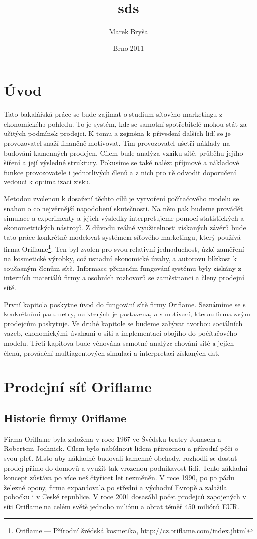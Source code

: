 \documentclass[a4wide,12pt]{report}
\title{sds}
\author{Marek Bryša}
\date{Brno 2011}
\begin{document}
\tableofcontents

\chapter*{Úvod}
Tato bakalářská práce se bude zajímat o studium síťového marketingu z ekonomického pohledu. To je systém, kde se samotní spotřebitelé mohou stát za učitých podmínek prodejci. K tomu a zejména k přivedení dalších lidí se je provozovatel snaží finančně motivovat. Tím provozovatel ušetří náklady na budování kamenných prodejen. Cílem bude analýza vzniku sítě, průběhu jejího šíření a její výsledné struktury. Pokusíme se také nalézt příjmové a nákladové funkce provozovatele i jednotlivých členů a z nich pro ně odvodit doporučení vedoucí k optimalizaci zisku.

Metodou zvolenou k dosažení těchto cílů je vytvoření počítačového modelu se snahou o co nejvěrnější napodobení skutečnosti. Na něm pak budeme provádět simulace a experimenty a jejich výsledky interpretujeme pomocí statistických a ekonometrických nástrojů. Z důvodu reálné využitelnosti získaných závěrů bude tato práce konkrétně modelovat systémem síťového marketingu, který používá firma Oriflame\footnote{Oriflame --- Přírodní švédská kosmetika, \url{http://cz.oriflame.com/index.jhtml}}. Ten byl zvolen pro svou relativní jednoduchost, úzké zaměření na kosmetické výrobky, což usnadní ekonomické úvahy, a autorovu blízkost k současným členům sítě. Informace přensném fungování systému byly získány z interních materiálů firmy a osobních rozhovorů se zaměstnanci a členy prodejní sítě.

První kapitola poskytne úvod do fungování sítě firmy Oriflame. Seznámíme se s konkrétními parametry, na kterých je postavena, a s motivací, kterou firma svým prodejcům poskytuje. Ve druhé kapitole se budeme zabývat tvorbou sociálních vazeb, ekonomickými úvahami o síti a implementací obojího do počítačového modelu. Třetí kapitova bude věnována samotné analýze chování sítě a jejích členů, provádění multiagentových simulací a interpretaci získaných dat.
\chapter{Prodejní síť Oriflame}
\section{Historie firmy Oriflame}
Firma Oriflame byla založena v roce 1967 ve Švédsku bratry Jonasem a Robertem Jochnick. Cílem bylo nabídnout lidem přirozenou a přírodní péči o svou pleť. Místo aby nákladně budovali kamenné obchody, rozhodli se dostat prodej přímo do domovů a využít tak vrozenou podnikavost lidí. Tento základní koncept zůstáva po více než čtyřicet let nezměněn. V roce 1990, po po pádu železné opony, firma expandovala po střední a východní Evropě a založila pobočku i v České republice. V roce 2001 dosasáhl počet prodejců zapojených v síti Oriflame na celém světě jednoho miliónu a obrat téměř 450 miliónů EUR.
\end{document}
